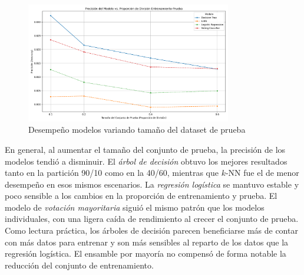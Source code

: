 \documentclass[12pt,a4paper]{article}
\begin{document}
\begin{enumerate}
      \begin{figure}[H]
        \centering
        \includegraphics[width=0.8\textwidth]{model_accuracy_vs_split_ratio.png}
        \caption{Desempeño modelos variando tamaño del dataset de prueba}
        \label{fig:comp_models_vtest}
      \end{figure}

      En general, al aumentar el tamaño del conjunto de prueba, la precisión de los modelos tendió a disminuir. 
      El \textit{árbol de decisión} obtuvo los mejores resultados tanto en la partición 90/10 como en la 40/60, mientras 
      que \(k\)-NN fue el de menor desempeño en esos mismos escenarios. La \textit{regresión logística} se 
      mantuvo estable y poco sensible a los cambios en la proporción de entrenamiento y prueba. El modelo de 
      \textit{votación mayoritaria} siguió el mismo patrón que los modelos individuales, con una ligera caída de 
      rendimiento al crecer el conjunto de prueba. Como lectura práctica, los árboles de decisión parecen beneficiarse 
      más de contar con más datos para entrenar y son más sensibles al reparto de los datos que la regresión logística. 
      El ensamble por mayoría no compensó de forma notable la reducción del conjunto de entrenamiento. 

\end{enumerate}
\end{document}
